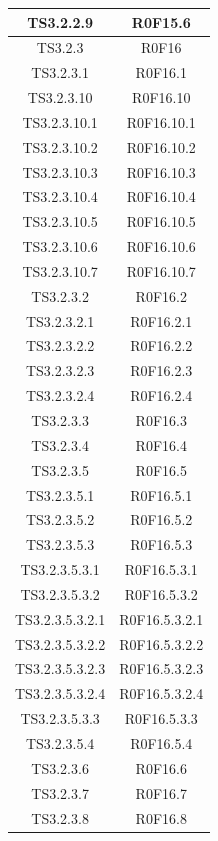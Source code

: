 \documentclass[../PianoDiQualifica.tex]{subfiles}
\begin{document}
\begin{longtable}{|c|c|}
		\hline
		TS3.2.2.9 & R0F15.6   \\
		\hline
		TS3.2.3 & R0F16   \\
		\hline
		TS3.2.3.1 & R0F16.1   \\
		\hline
		TS3.2.3.10 & R0F16.10   \\
		\hline
		TS3.2.3.10.1 & R0F16.10.1   \\
		\hline
		TS3.2.3.10.2 & R0F16.10.2   \\
		\hline
		TS3.2.3.10.3 & R0F16.10.3   \\
		\hline
		TS3.2.3.10.4 & R0F16.10.4   \\
		\hline
		TS3.2.3.10.5 & R0F16.10.5   \\
		\hline
		TS3.2.3.10.6 & R0F16.10.6   \\
		\hline
		TS3.2.3.10.7 & R0F16.10.7   \\
		\hline
		TS3.2.3.2 & R0F16.2   \\
		\hline
		TS3.2.3.2.1 & R0F16.2.1   \\
		\hline
		TS3.2.3.2.2 & R0F16.2.2   \\
		\hline
		TS3.2.3.2.3 & R0F16.2.3   \\
		\hline
		TS3.2.3.2.4 & R0F16.2.4   \\
		\hline
		TS3.2.3.3 & R0F16.3   \\
		\hline
		TS3.2.3.4 & R0F16.4   \\
		\hline
		TS3.2.3.5 & R0F16.5   \\
		\hline
		TS3.2.3.5.1 & R0F16.5.1   \\
		\hline
		TS3.2.3.5.2 & R0F16.5.2   \\
		\hline
		TS3.2.3.5.3 & R0F16.5.3   \\
		\hline
		TS3.2.3.5.3.1 & R0F16.5.3.1   \\
		\hline
		TS3.2.3.5.3.2 & R0F16.5.3.2   \\
		\hline
		TS3.2.3.5.3.2.1 & R0F16.5.3.2.1   \\
		\hline
		TS3.2.3.5.3.2.2 & R0F16.5.3.2.2   \\
		\hline
		TS3.2.3.5.3.2.3 & R0F16.5.3.2.3   \\
		\hline
		TS3.2.3.5.3.2.4 & R0F16.5.3.2.4   \\
		\hline
		TS3.2.3.5.3.3 & R0F16.5.3.3   \\
		\hline
		TS3.2.3.5.4 & R0F16.5.4   \\
		\hline
		TS3.2.3.6 & R0F16.6   \\
		\hline
		TS3.2.3.7 & R0F16.7   \\
		\hline
		TS3.2.3.8 & R0F16.8   \\

\end{longtable}
\end{document}
